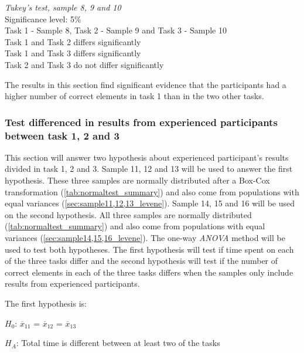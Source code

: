  \begin{center}
	\begin{tcolorbox}[width=0.8\textwidth]
		\centering
		\textit{Tukey's test, sample 8, 9 and 10}\\
		Significance level: 5\%  \\[0.5cm]
		Task 1 - Sample 8, Task 2 - Sample 9 and Task 3 - Sample 10 \\[0.5cm]
		
		Task 1 and Task 2 differs significantly \\
		Task 1 and Task 3 differs significantly \\
		Task 2 and Task 3 do not differ significantly \\[0.2cm]
	\end{tcolorbox} 
\end{center}

\vspace{0.3cm}

The results in this section find significant evidence that the participants had a higher number of correct elements in task 1 than in the two other tasks. 

\subsubsection[Sample 11 - 16]{Test differenced in results from experienced participants between task 1, 2 and 3}\label{sec:sample_11_12_13_anova}
This section will answer two hypothesis about experienced participant's results divided in task 1, 2 and 3. Sample 11, 12 and 13 will be used to answer the first hypothesis. These three samples are normally distributed after a Box-Cox transformation (\ref{tab:normaltest_summary}) and also come from populations with equal variances (\ref{sec:sample11,12,13_levene}). Sample 14, 15 and 16 will be used on the second hypothesis. All three samples are normally distributed (\ref{tab:normaltest_summary}) and also come from populations with equal variances (\ref{sec:sample14,15,16_levene}). The one-way \textit{ANOVA} method will be used to test both hypotheses. The first hypothesis will test if time spent on each of the three tasks differ and the second hypothesis will test if the number of correct elements in each of the three tasks differs when the samples only include results from experienced participants. 

The first hypothesis is:\\
\centerline{$H_{0}$: $\overline{x}_{11}$ = $\overline{x}_{12}$ = $\overline{x}_{13}$}
\centerline{$H_{A}$: Total time is different between at least two of the tasks}


